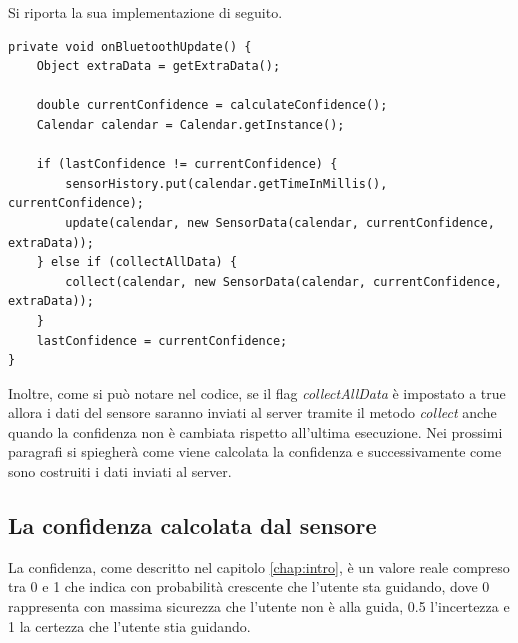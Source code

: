 Si riporta la sua implementazione di seguito.

\begin{verbatim}
private void onBluetoothUpdate() {
    Object extraData = getExtraData();

    double currentConfidence = calculateConfidence();
    Calendar calendar = Calendar.getInstance();

    if (lastConfidence != currentConfidence) {
        sensorHistory.put(calendar.getTimeInMillis(), currentConfidence);
        update(calendar, new SensorData(calendar, currentConfidence, extraData));
    } else if (collectAllData) {
        collect(calendar, new SensorData(calendar, currentConfidence, extraData));
    }
    lastConfidence = currentConfidence;
}
\end{verbatim}
Inoltre, come si può notare nel codice, se il flag \textit{collectAllData} è impostato a true allora i dati del sensore saranno inviati al server tramite il metodo \textit{collect} anche quando la confidenza non è cambiata rispetto all'ultima esecuzione. Nei prossimi paragrafi si spiegherà come viene calcolata la confidenza e successivamente come sono costruiti i dati inviati al server.

\subsection{La confidenza calcolata dal sensore}
La confidenza, come descritto nel capitolo \ref{chap:intro}, è un valore reale compreso tra 0 e 1 che indica con probabilità crescente che l'utente sta guidando, dove 0 rappresenta con massima sicurezza che l'utente non è alla guida, 0.5 l'incertezza e 1 la certezza che l'utente stia guidando.

